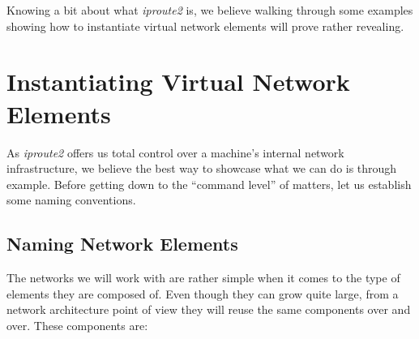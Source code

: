        Knowing a bit about what \textit{iproute2} is, we believe walking through some examples showing how to instantiate virtual network elements will prove rather revealing.\\

    \section{Instantiating Virtual Network Elements}
        As \textit{iproute2} offers us total control over a machine's internal network infrastructure, we believe the best way to showcase what we can do is through example. Before getting down to the ``command level'' of matters, let us establish some naming conventions.\\

        \subsection{Naming Network Elements}
            The networks we will work with are rather simple when it comes to the type of elements they are composed of. Even though they can grow quite large, from a network architecture point of view they will reuse the same components over and over. These components are:\\

